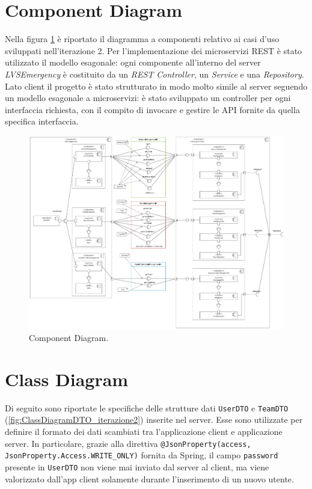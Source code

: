 \section{Component Diagram}
Nella figura \ref{fig:ComponentDiagram_iterazione2} è riportato il diagramma a componenti relativo ai casi d'uso sviluppati nell'iterazione 2. Per l'implementazione dei microservizi REST è stato utilizzato il modello esagonale: ogni componente all'interno del server \textit{LVSEmergency} è costituito da un \textit{REST Controller}, un \textit{Service} e una \textit{Repository}.
Lato client il progetto è stato strutturato in modo molto simile al server seguendo un modello esagonale a microservizi: è stato sviluppato un controller per ogni interfaccia richiesta, con il compito di invocare e gestire le API fornite da quella specifica interfaccia. 

\begin{figure}[h!]
	\centering
	\includegraphics[width=1\linewidth]{./Iterazione 2/OtherFiles/UML - Component View}
	\caption{Component Diagram.}
	\label{fig:ComponentDiagram_iterazione2}
\end{figure}

\clearpage

\section{Class Diagram}
Di seguito sono riportate le specifiche delle strutture dati \texttt{UserDTO} e \texttt{TeamDTO} (\Fig\ref{fig:ClassDiagramDTO_iterazione2}) inserite nel server. Esse sono utilizzate per definire il formato dei dati scambiati tra l'applicazione client e applicazione server. In particolare, grazie alla direttiva \texttt{@JsonProperty(access, JsonProperty.Access.WRITE\_ONLY)} fornita da Spring, il campo \texttt{password} presente in \texttt{UserDTO} non viene mai inviato dal server al client, ma viene valorizzato dall'app client solamente durante l'inserimento di un nuovo utente.  

